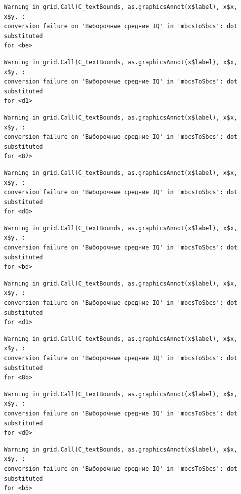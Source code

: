 \documentclass[
  letterpaper,
  DIV=11,
  numbers=noendperiod]{scrreprt}
\theoremstyle{definition}
\theoremstyle{remark}
\begin{document}
\begin{verbatim}
Warning in grid.Call(C_textBounds, as.graphicsAnnot(x$label), x$x, x$y, :
conversion failure on 'Выборочные средние IQ' in 'mbcsToSbcs': dot substituted
for <be>
\end{verbatim}

\begin{verbatim}
Warning in grid.Call(C_textBounds, as.graphicsAnnot(x$label), x$x, x$y, :
conversion failure on 'Выборочные средние IQ' in 'mbcsToSbcs': dot substituted
for <d1>
\end{verbatim}

\begin{verbatim}
Warning in grid.Call(C_textBounds, as.graphicsAnnot(x$label), x$x, x$y, :
conversion failure on 'Выборочные средние IQ' in 'mbcsToSbcs': dot substituted
for <87>
\end{verbatim}

\begin{verbatim}
Warning in grid.Call(C_textBounds, as.graphicsAnnot(x$label), x$x, x$y, :
conversion failure on 'Выборочные средние IQ' in 'mbcsToSbcs': dot substituted
for <d0>
\end{verbatim}

\begin{verbatim}
Warning in grid.Call(C_textBounds, as.graphicsAnnot(x$label), x$x, x$y, :
conversion failure on 'Выборочные средние IQ' in 'mbcsToSbcs': dot substituted
for <bd>
\end{verbatim}

\begin{verbatim}
Warning in grid.Call(C_textBounds, as.graphicsAnnot(x$label), x$x, x$y, :
conversion failure on 'Выборочные средние IQ' in 'mbcsToSbcs': dot substituted
for <d1>
\end{verbatim}

\begin{verbatim}
Warning in grid.Call(C_textBounds, as.graphicsAnnot(x$label), x$x, x$y, :
conversion failure on 'Выборочные средние IQ' in 'mbcsToSbcs': dot substituted
for <8b>
\end{verbatim}

\begin{verbatim}
Warning in grid.Call(C_textBounds, as.graphicsAnnot(x$label), x$x, x$y, :
conversion failure on 'Выборочные средние IQ' in 'mbcsToSbcs': dot substituted
for <d0>
\end{verbatim}

\begin{verbatim}
Warning in grid.Call(C_textBounds, as.graphicsAnnot(x$label), x$x, x$y, :
conversion failure on 'Выборочные средние IQ' in 'mbcsToSbcs': dot substituted
for <b5>
\end{verbatim}
\end{document}
